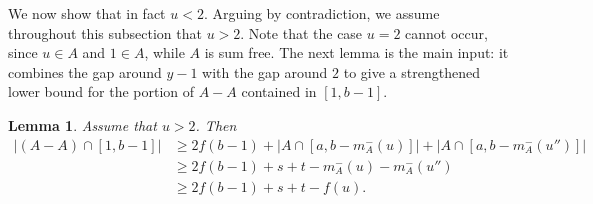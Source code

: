 \documentclass[11pt,reqno]{amsart}
\newtheorem{lem}[thm]{Lemma}
\theoremstyle{definition}
\def\F#1{f(#1)}
\begin{document}
We now show that in fact $u<2$. Arguing by contradiction, we assume throughout this subsection that $u>2$. Note that the case $u=2$ cannot occur, since $u\in A$ and $1\in A$, while $A$ is sum free. The next lemma is the main input: it combines the gap around $y-1$ with the gap around $2$ to give a strengthened lower bound for the portion of $A-A$ contained in $[1,b-1]$.
\begin{lem} \label{double boost lem}
    Assume that $u>2$. Then
    \begin{align*}
        |(A - A)\cap [1, b - 1]|
        &\geq 2\F{b - 1}
        + |A\cap [a, b - m_A^-(u)]|
        + |A\cap [a, b - m_A^-(u'')]|\\
        &\geq 2\F{b - 1} + s + t - m_A^-(u) - m_A^-(u'')\\
        &\geq 2\F{b - 1} + s + t - \F{u} .
    \end{align*}
\end{lem}
\end{document}
